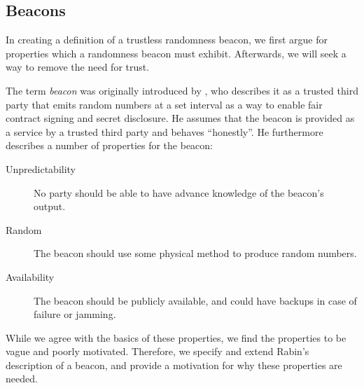 
\subsection{Beacons}

In creating a definition of a trustless randomness beacon, we first argue for properties which a randomness beacon must exhibit. Afterwards, we will seek a way to remove the need for trust.

The term \emph{beacon} was originally introduced by \citet{rabin1983transaction}, who describes it as a trusted third party that emits random numbers at a set interval as a way to enable fair contract signing and secret disclosure.
He assumes that the beacon is provided as a service by a trusted third party and behaves \enquote{honestly}.
He furthermore describes a number of properties for the beacon:

\begin{description}
    \item[Unpredictability] No party should be able to have advance knowledge of the beacon's output.
    \item[Random] The beacon should use some physical method to produce random numbers.
    \item[Availability] The beacon should be publicly available, and could have backups in case of failure or jamming.
\end{description}

While we agree with the basics of these properties, we find the properties to be vague and poorly motivated. Therefore, we specify and extend Rabin's description of a beacon, and provide a motivation for why these properties are needed.


